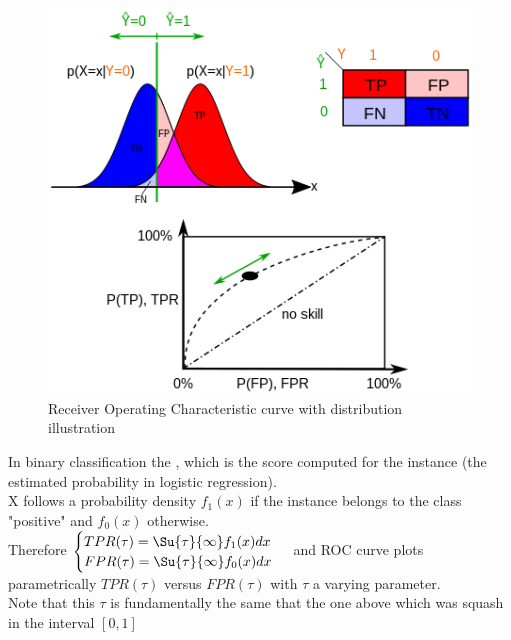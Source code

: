 \begin{figure}[H]
    \begin{center}
        \includegraphics[width=.5\textwidth]{chapters/2_statistics/03_bayesian_approach/images/2_roc_curves_distrib.png}
    \end{center}
    \caption{Receiver Operating Characteristic curve with distribution illustration}
    \label{fig:2_roc_curves_distrib}
\end{figure}
In binary classification the  , which is the score computed for the instance 
(the estimated probability in logistic regression).\\
X follows a probability density $f_{1}(x)$ if the instance belongs to the class 
"positive" and $f_{0}(x)$ otherwise.\\
Therefore 
$\begin{cases}
    TPR(\tau) = \Su{\tau}{\infty}f_{1}(x)dx \\
    FPR(\tau) = \Su{\tau}{\infty}f_{0}(x)dx
\end{cases}$
and ROC curve plots parametrically $TPR(\tau)$ versus $FPR(\tau)$ with $\tau$ a varying
parameter.\\
Note that this $\tau$ is fundamentally the same that the one above which was squash in
the interval $[0, 1]$


